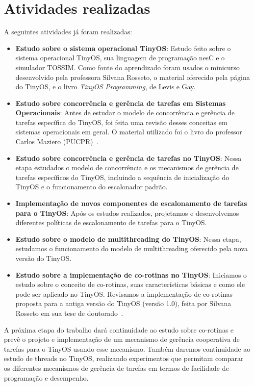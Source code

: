 \documentclass[a4paper,onecolumn, 10pt]{article}
\begin{document}
\section{Atividades realizadas}\label{atividades}
A seguintes atividades já foram realizadas:
\begin{itemize}
\item {\bf Estudo sobre o sistema operacional TinyOS}:
Estudo feito sobre o sistema operacional TinyOS, sua linguagem de programação nesC e o simulador TOSSIM.
Como fonte do aprendizado foram usados o minicurso desenvolvido pela 
professora Silvana Rosseto\cite{Rossetto/10}, o material oferecido
pela página do TinyOS\cite{tinyos}, e o livro \textit{TinyOS Programming}, de Levis e Gay\cite{LevisGay/09}.

\item {\bf Estudo sobre concorrência e gerência de tarefas em Sistemas Operacionais}:
Antes de estudar o modelo de concorrência e gerência de tarefas específica do TinyOS, 
foi feita uma revisão desses conceitas em sistemas operacionais em geral. 
O material utilizado foi o livro do professor Carlos Maziero (PUCPR)~\cite{Maziero/11}.

\item {\bf Estudo sobre concorrência e gerência de tarefas no TinyOS}:
Nessa etapa estudados o modelo de concorrência e os mecanismos de gerência 
de tarefas específicos do TinyOS, incluindo a sequência de inicialização do
TinyOS e o funcionamento do escalonador padrão.

\item {\bf Implementação de novos componentes de escalonamento de tarefas para o TinyOS}:
Após os estudos realizados, projetamos e desenvolvemos diferentes políticas de escalonamento
de tarefas para o TinyOS.

\item {\bf Estudo sobre o modelo de multithreading do TinyOS}:
Nessa etapa, estudamos o funcionamento do modelo de multithreading oferecido pela nova versão do TinyOS.

\item{\bf Estudo sobre a implementação de co-rotinas no TinyOS}:
Iniciamos o estudo sobre o conceito de co-rotinas, suas características básicas  e como ele 
pode ser  aplicado no TinyOS. Revisamos a implementação de co-rotinas proposta para a antiga versão do 
TinyOS (versão 1.0), feita por Silvana Rosseto em sua tese de doutorado~\cite{Rossetto/06}.
\end{itemize}

A próxima etapa do trabalho dará continuidade ao estudo sobre co-rotinas e prevê 
o projeto e implementação de um mecanismo de gerência cooperativa de tarefas para o TinyOS usando
esse mecanismo. 
Também daremos continuidade ao estudo de threads no TinyOS, realizando experimentos 
que permitam comparar os diferentes mecanismos de gerência de tarefas em termos de facilidade
de programação e desempenho. 
\end{document}

